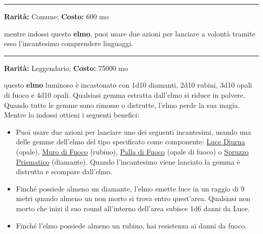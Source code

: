 \begin{multicols}{2}
\smallskip\noindent\rule{\linewidth}{2pt}  \hypertarget{ElmodellaComprensionedeiLinguaggi}{}\medskip{}\noindent\label{ElmodellaComprensionedeiLinguaggi}

\textbf{Rarità:} Comune; \textbf{Costo:} 600 mo

mentre indossi questo \textbf{elmo}, puoi usare due azioni per lanciare a volontà tramite esso l'incantesimo comprendere linguaggi.

\smallskip\noindent\rule{\linewidth}{2pt}  \hypertarget{ElmodellaLucentezza}{}\medskip{}\noindent\label{ElmodellaLucentezza}

\textbf{Rarità:} Leggendario; \textbf{Costo:} 75000 mo

questo \textbf{elmo} luminoso è incastonato con 1d10 diamanti, 2d10 rubini, 3d10 opali di fuoco e 4d10 opali. Qualsiasi gemma estratta dall'elmo si riduce in polvere. Quando tutte le gemme sono rimosse o distrutte, l'elmo perde la sua magia. Mentre lo indossi ottieni i seguenti benefici:

\smallskip

\begin{itemize}[leftmargin=*] \setlength{\itemsep}{0pt}
\item
Puoi usare due azioni per lanciare uno dei seguenti incantesimi, usando una delle gemme dell'elmo del tipo specificato come componente: \hyperlink{Luce Diurna}{Luce Diurna} (opale), \hyperlink{Muro di Fuoco}{Muro di Fuoco} (rubino), \hyperlink{Palla di Fuoco}{Palla di Fuoco} (opale di fuoco) o \hyperlink{Spruzzo Prismatico}{Spruzzo Prismatico} (diamante). Quando l'incantesimo viene lanciato la gemma è distrutta e scompare dall'elmo.

\item
Finché possiede almeno un diamante, l'elmo emette luce in un raggio di 9 metri quando almeno un non morto si trova entro quest'area. Qualsiasi non morto che inizi il suo round all'interno dell'area subisce 1d6 danni da Luce.

\item
Finché l'elmo possiede almeno un rubino, hai resistenza ai danni da fuoco.
\end{itemize}

\smallskip


\end{multicols}
